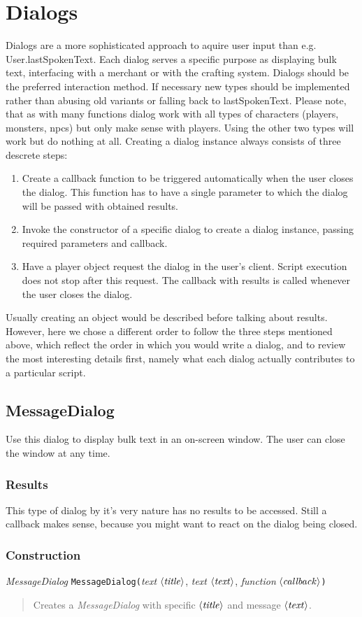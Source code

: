 \documentclass[a4paper,10pt,makeidx]{scrreprt}
\newcommand{\com}[2]{\index{#1}\texttt{#1(}#2\texttt{)}}
\newcommand{\var}[1]{$\left\langle \text{\emph{#1}} \right\rangle$}
\newcommand{\txt}{\textsl{text }}
\newcommand{\function}{\textsl{function }}
\begin{document}
\chapter{Dialogs}
Dialogs are a more sophisticated approach to aquire user input than e.g. User.lastSpokenText. Each dialog serves a specific purpose as displaying bulk text, interfacing with a merchant or with the crafting system. Dialogs should be the preferred interaction method. If necessary new types should be implemented rather than abusing old variants or falling back to lastSpokenText. Please note, that as with many functions dialog work with all types of characters (players, monsters, npcs) but only make sense with players. Using the other two types will work but do nothing at all. Creating a dialog instance always consists of three descrete steps:
\begin{enumerate}
\item Create a callback function to be triggered automatically when the user closes the dialog. This function has to have a single parameter to which the dialog will be passed with obtained results.
\item Invoke the constructor of a specific dialog to create a dialog instance, passing required parameters and callback.
\item Have a player object request the dialog in the user's client. Script execution does not stop after this request. The callback with results is called whenever the user closes the dialog.
\end{enumerate}
Usually creating an object would be described before talking about results. However, here we chose a different order to follow the three steps mentioned above, which reflect the order in which you would write a dialog, and to review the most interesting details first, namely what each dialog actually contributes to a particular script.

\section{MessageDialog}
Use this dialog to display bulk text in an on-screen window. The user can close the window at any time.
\subsection{Results}
This type of dialog by it's very nature has no results to be accessed. Still a callback makes sense, because you might want to react on the dialog being closed.
\subsection{Construction}
\textsl{MessageDialog} \com{MessageDialog}{\txt \var{title}, \txt \var{text}, \function \var{callback}}
\begin{quote}
    Creates a \textsl{MessageDialog} with specific \var{title} and message \var{text}.
\end{quote}
\end{document}
